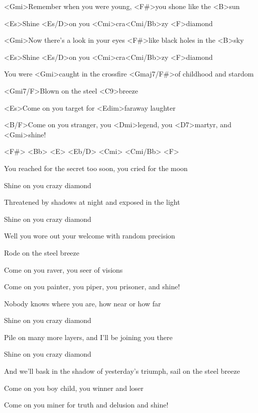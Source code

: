 

\zs
<Gmi>Remember when you were young,
<F#>you shone like the <B>sun

<Es>Shine <Es/D>on you <Cmi>cra<Cmi/Bb>zy <F>diamond

<Gmi>Now there's a look in your eyes
<F#>like black holes in the <B>sky

<Es>Shine <Es/D>on you <Cmi>cra<Cmi/Bb>zy <F>diamond

You were <Gmi>caught in the crossfire
<Gmaj7/F#>of childhood and stardom

<Gmi7/F>Blown on the steel <C9>breeze

<Es>Come on you target for <Edim>faraway laughter

<B/F>Come on you stranger, you <Dmi>legend, you <D7>martyr, and <Gmi>shine!
\ks

<F#> <Bb> <E> <Eb/D> <Cmi> <Cmi/Bb> <F>

\zs
You reached for the secret too soon,
you cried for the moon

Shine on you crazy diamond

Threatened by shadows at night
and exposed in the light

Shine on you crazy diamond

Well you wore out your welcome
with random precision

Rode on the steel breeze

Come on you raver, you seer of visions

Come on you painter, you piper, you prisoner, and shine!
\ks

\zs
Nobody knows where you are,
how near or how far

Shine on you crazy diamond

Pile on many more layers,
and I'll be joining you there

Shine on you crazy diamond

And we'll bask in the shadow of yesterday's triumph,
sail on the steel breeze

Come on you boy child, you winner and loser

Come on you miner for truth and delusion and shine!
\ks

\kp
